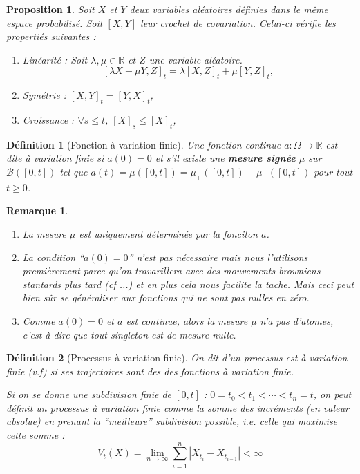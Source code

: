 \documentclass[openany]{book}
\newcommand{\R}{\mathbb{R}}
\newcommand{\1}{\mathbbm{1}}
\theoremstyle{thmfont}
\theoremstyle{deffont}
\newtheorem{definition}[definition]{Définition}
\theoremstyle{thmfont}
\newtheorem{prop}[prop]{Proposition}
\theoremstyle{deffont}
\newtheorem*{remark}{Remarque}
\begin{document}
\begin{prop} Soit $X$ et $Y$ deux variables aléatoires définies dans le même espace probabilisé. Soit $[X,Y]$ leur crochet de covariation. Celui-ci vérifie les propertiés suivantes : 
  \begin{enumerate}
  \item Linéarité : Soit $\lambda, \mu \in \R$ et $Z$ une variable aléatoire. $$[\lambda X + \mu Y, Z]_t = \lambda[X,Z]_t + \mu[Y,Z]_t,$$
  \item Symétrie : $[X,Y]_t = [Y,X]_t$,
  \item Croissance : $\forall s\leq t$, $[X]_s \leq [X]_t$,
  \end{enumerate}
\end{prop}

\begin{definition}[Fonction à variation finie] Une fonction continue $a : \Omega \rightarrow \R$ est dite \textit{à variation finie} si $a(0) = 0$ et s'il existe une \textbf{mesure signée} $\mu$ sur $\mathcal B([0,t])$ tel que $a(t) = \mu([0,t]) = \mu_+([0,t]) - \mu_-([0,t])$ pour tout $t \geq 0$.
\label{def:fct_var_finie}
\end{definition}

\begin{remark}
  \begin{enumerate}
  \item La mesure $\mu$ est uniquement déterminée par la fonciton $a$.
  \item La condition ``$a(0)=0$'' n'est pas nécessaire mais nous l'utilisons premièrement parce qu'on travarillera avec des mouvements browniens stantards plus tard {\color{red}(cf ...)} et en plus cela nous facilite la tache. Mais ceci peut bien sûr se généraliser aux fonctions qui ne sont pas nulles en zéro.
  \item Comme $a(0) = 0$ et $a$ est continue, alors la mesure $\mu$ n'a pas d'\textit{atomes}, c'est à dire que tout singleton est de mesure nulle.
  \end{enumerate}
\end{remark}

\begin{definition}[Processus à variation finie]
  On dit d'un processus est \textit{à variation finie} (v.f) si ses trajectoires sont des des fonctions à variation finie.

  Si on se donne une subdivision finie de $[0,t]$ :  $0 = t_0 < t_1 < \cdots < t_n = t$, on peut définit un processus à variation finie comme la somme des incréments (en valeur absolue) en prenant la ``meilleure'' subdivision possible, i.e. celle qui maximise cette somme :
  $$ V_t(X) = \lim_{n \to \infty} \sum_{i=1}^n |X_{t_i} - X_{t_{i-1}}| < \infty$$
\end{definition}
\end{document}
